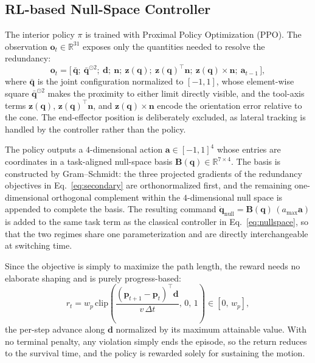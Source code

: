 \documentclass{svproc}
\begin{document}
\subsection{RL-based Null-Space Controller}
The interior policy $\pi$ is trained with Proximal Policy Optimization (PPO). The observation $\mathbf{o}_{t}\in\mathbb{R}^{31}$ exposes only the quantities needed to resolve the redundancy:
\begin{equation}
\label{eq:obs}
\mathbf{o}_{t}=\big[\,\bar{\mathbf{q}};\ \bar{\mathbf{q}}^{\odot 2};\ \mathbf{d};\ \mathbf{n};\ \mathbf{z}(\mathbf{q});\ \mathbf{z}(\mathbf{q})^{\top}\mathbf{n};\ \mathbf{z}(\mathbf{q})\times\mathbf{n};\ \mathbf{a}_{t-1}\,\big],
\end{equation}
where $\bar{\mathbf{q}}$ is the joint configuration normalized to $[-1,1]$, whose element-wise square $\bar{\mathbf{q}}^{\odot 2}$ makes the proximity to either limit directly visible, and the tool-axis terms $\mathbf{z}(\mathbf{q})$, $\mathbf{z}(\mathbf{q})^{\top}\mathbf{n}$, and $\mathbf{z}(\mathbf{q})\times\mathbf{n}$ encode the orientation error relative to the cone. The end-effector position is deliberately excluded, as lateral tracking is handled by the controller rather than the policy.

The policy outputs a $4$-dimensional action $\mathbf{a}\in[-1,1]^{4}$ whose entries are coordinates in a task-aligned null-space basis $\mathbf{B}(\mathbf{q})\in\mathbb{R}^{7\times 4}$. The basis is constructed by Gram--Schmidt: the three projected gradients of the redundancy objectives in Eq.~\eqref{eq:secondary} are orthonormalized first, and the remaining one-dimensional orthogonal complement within the $4$-dimensional null space is appended to complete the basis. The resulting command $\dot{\mathbf{q}}_{\mathrm{null}}=\mathbf{B}(\mathbf{q})\,(a_{\max}\mathbf{a})$ is added to the same task term as the classical controller in Eq.~\eqref{eq:nullspace}, so that the two regimes share one parameterization and are directly interchangeable at switching time.

Since the objective is simply to maximize the path length, the reward needs no elaborate shaping and is purely progress-based:
\begin{equation}
\label{eq:reward}
r_{t} = w_{p}\,\mathrm{clip}\!\left(\frac{(\mathbf{p}_{t+1}-\mathbf{p}_{t})^{\top}\mathbf{d}}{v\,\Delta t},\,0,\,1\right)\in[0,\,w_{p}],
\end{equation}
the per-step advance along $\mathbf{d}$ normalized by its maximum attainable value. With no terminal penalty, any violation simply ends the episode, so the return reduces to the survival time, and the policy is rewarded solely for sustaining the motion.
\end{document}
